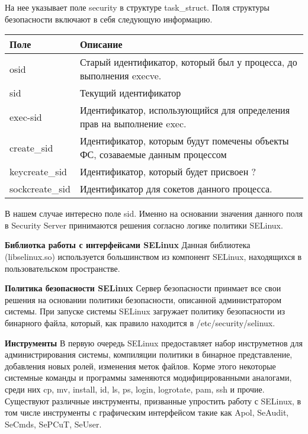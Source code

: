 \bigskip
На нее указывает поле security в структуре task\_struct. Поля структуры безопасности включают в себя следующую информацию. 

\begin{tabular}{|p{3cm}|p{9cm}|}
\hline 
\ttfamily Поле 
& 
Описание \\ 
\hline
osid
& 
Старый идентификатор, который был у процесса, до выполнения execve. \\
\hline
sid
& 
Текущий идентификатор \\
\hline
exec-sid
&
Идентификатор, использующийся для определения прав на выполнение exec. \\
\hline
create\_sid 
&
Идентификатор, которым будут помечены объекты ФС, созаваемые данным процессом \\
\hline
keycreate\_sid
& 
Идентификатор, который будет присвоен ? \\ 
\hline
sockcreate\_sid  
&
Идентификатор для сокетов данного процесса. \\ 
\hline
\end {tabular}

\bigskip
В нашем случае интересно поле sid. Именно на основании значения данного поля в Security Server принимаются решения согласно логике политики SELinux. 

\bigskip
{\bfseries Библиотка работы с интерфейсами SELinux} 
Данная библиотека (libselinux.so) используется большинством из компонент SELinux, находящихся в пользовательском пространстве.

\bigskip
{\bfseries Политика безопасности SELinux} 
Сервер безопасности принмает все свои решения на основании политики безопасности, описанной администратором системы. При запуске системы SELinux загружает политику безопасности из бинарного файла, который, как правило находится в /etc/security/selinux. 

\bigskip
{\bfseries Инструменты} 
В первую очередь SELinux предоставляет набор инструметнов для администрирования системы, компиляции политики в бинарное представление, добавления новых ролей, изменения меток файлов. Корме этого некоторые системные команды и программы заменяются модифицированными аналогами, среди них cp, mv, install, id, ls, ps, login, logrotate, pam, ssh и прочие. Существуют различные инструменты, призванные упростить работу с SELinux, в том числе инструменты с графическим интерфейсом такие как Apol, SeAudit, SeCmds, SePCuT, SeUser. 
